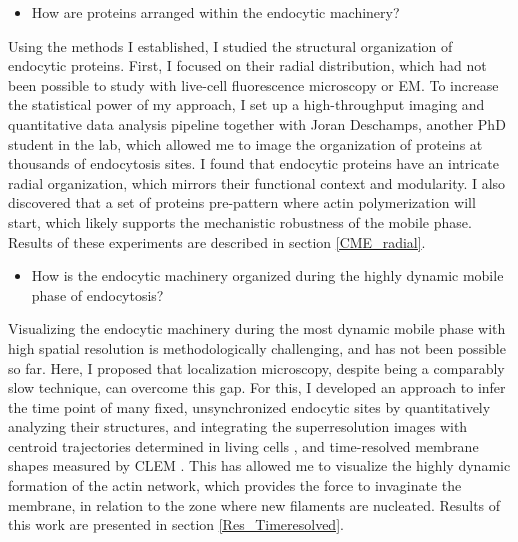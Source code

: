 \begin{itemize}
	\item How are proteins arranged within the endocytic machinery?
\end{itemize}

Using the methods I established, I studied the structural organization of endocytic proteins. First, I focused on their radial distribution, which had not been possible to study with live-cell fluorescence microscopy or EM. To increase the statistical power of my approach, I set up a high-throughput imaging and quantitative data analysis pipeline together with Joran Deschamps, another PhD student in the lab, which allowed me to image the organization of proteins at thousands of endocytosis sites. I found that endocytic proteins have an intricate radial organization, which mirrors their functional context and modularity. I also discovered that a set of proteins pre-pattern where actin polymerization will start, which likely supports the mechanistic robustness of the mobile phase. Results of these experiments are described in section \ref{CME_radial}.

\begin{itemize}
	\item How is the endocytic machinery organized during the highly dynamic mobile phase of endocytosis?
\end{itemize}

Visualizing the endocytic machinery during the most dynamic mobile phase with high spatial resolution is methodologically challenging, and has not been possible so far. Here, I proposed that localization microscopy, despite being a comparably slow technique, can overcome this gap. For this, I developed an approach to infer the time point of many fixed, unsynchronized endocytic sites by quantitatively analyzing their structures, and integrating the superresolution images with centroid trajectories determined in living cells \citep{Picco:2015iv}, and time-resolved membrane shapes measured by CLEM \citep{Kukulski:2012jl}. This has allowed me to visualize the highly dynamic formation of the actin network, which provides the force to invaginate the membrane, in relation to the zone where new filaments are nucleated. Results of this work are presented in section \ref{Res_Timeresolved}.